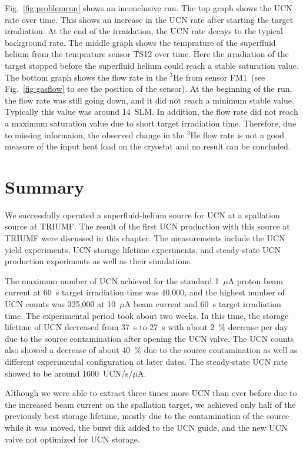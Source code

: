 Fig.~\ref{fig:problemrun} shows an inconclusive run. The top graph
shows the UCN rate over time. This shows an increase in the UCN rate
after starting the target irradiation. At the end of the irraidation,
the UCN rate decays to the typical background rate. The middle graph
shows the temprature of the superfluid helium from the temprature
sensor TS12 over time. Here the irradiation of the target stopped
before the superfluid helium could reach a stable saturation
value. The bottom graph shows the flow rate in the $^3$He from sensor
FM1~(see Fig.~\ref{fig:gasflow} to see the position of the sensor). At
the beginning of the run, the flow rate was still going down, and it
did not reach a minimum stable value. Typically this value was around
14~SLM. In addition, the flow rate did not reach a maximum saturation
value due to short target irradiation time. Therefore, due to missing
informaion, the observed change in the $^3$He flow rate is not a good
measure of the input heat load on the cryostat and no result can be
concluded.


\section{Summary}
We successfully operated a superfluid-helium source for UCN at a
spallation source at TRIUMF. The result of the first UCN production
with this source at TRIUMF were discussed in this
chapter. The measurements include the UCN yield experiments, UCN
storage lifetime experiments, and steady-state UCN production
experiments as well as their simulations.

The maximum number of UCN achieved for the standard 1~$\mu$A proton
beam current at 60~s target irradiation time was 40,000, and the highest
number of UCN counts was 325,000 at 10~$\mu$A beam current and 60~s
target irradiation time. The experimental period took about two
weeks. In this time, the storage lifetime of UCN decreased from 37~s
to 27~s with about 2~\% decrease per day due to the source
contamination after opening the UCN valve. The UCN counts also showed
a decrease of about 40~\% due to the source contamination as well as
different experimental configuration at later dates. The steady-state
UCN rate showed to be around 1600~UCN/s/$\mu$A.

Although we were able to extract three times more UCN than ever before
due to the increased beam current on the spallation target, we
achieved only half of the previously best storage lifetime, mostly due
to the contamination of the source while it was moved, the burst dik
added to the UCN guide, and the new UCN valve not optimized for UCN
storage.

